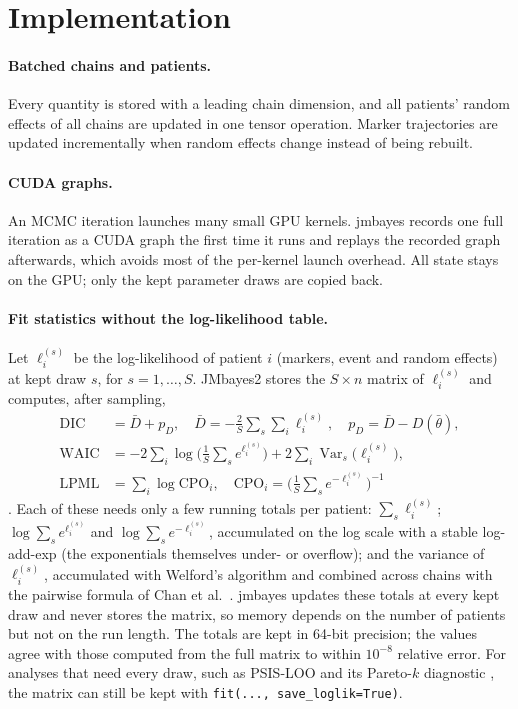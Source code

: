 \documentclass[11pt]{article}
\begin{document}
\section{Implementation}\label{sec:impl}

\paragraph{Batched chains and patients.} Every quantity is stored with a leading chain
dimension, and all patients' random effects of all chains are updated in one tensor
operation. Marker trajectories are updated incrementally when random effects change
instead of being rebuilt.

\paragraph{CUDA graphs.} An MCMC iteration launches many small GPU kernels. jmbayes records
one full iteration as a CUDA graph the first time it runs and replays the recorded graph
afterwards, which avoids most of the per-kernel launch overhead. All state stays on the GPU; only the
kept parameter draws are copied back.

\paragraph{Fit statistics without the log-likelihood table.} Let $\ell_i^{(s)}$ be the
log-likelihood of patient $i$ (markers, event and random effects) at kept draw $s$, for
$s = 1, \dots, S$. JMbayes2 stores the $S \times n$ matrix of $\ell_i^{(s)}$ and computes,
after sampling,
\begin{align*}
  \mathrm{DIC} &= \bar{D} + p_D, \quad \bar{D} = -\tfrac{2}{S} \textstyle\sum_s \sum_i \ell_i^{(s)},
    \quad p_D = \bar{D} - D(\bar\theta), \\
  \mathrm{WAIC} &= -2 \textstyle\sum_i \log\big( \tfrac{1}{S} \sum_s e^{\ell_i^{(s)}} \big)
    + 2 \sum_i \operatorname{Var}_s\big(\ell_i^{(s)}\big), \\
  \mathrm{LPML} &= \textstyle\sum_i \log \mathrm{CPO}_i, \quad
    \mathrm{CPO}_i = \big( \tfrac{1}{S} \sum_s e^{-\ell_i^{(s)}} \big)^{-1}
\end{align*}
\cite{spiegelhalter2002,watanabe2010,geisser1979}. Each of these needs only a few running
totals per patient: $\sum_s \ell_i^{(s)}$; $\log \sum_s e^{\ell_i^{(s)}}$ and
$\log \sum_s e^{-\ell_i^{(s)}}$, accumulated on the log scale with a stable log-add-exp
(the exponentials themselves under- or overflow); and the variance of $\ell_i^{(s)}$,
accumulated with Welford's algorithm \cite{welford1962} and combined across chains with the
pairwise formula of Chan et al.\ \cite{chan1983}. jmbayes updates these totals at every
kept draw and never stores the matrix, so memory depends on the number of patients but not
on the run length. The totals are kept in 64-bit precision; the values agree with those
computed from the full matrix to within $10^{-8}$ relative error. For analyses that need
every draw, such as PSIS-LOO and its Pareto-$k$ diagnostic \cite{vehtari2017}, the matrix
can still be kept with \texttt{fit(..., save\_loglik=True)}.
\end{document}
